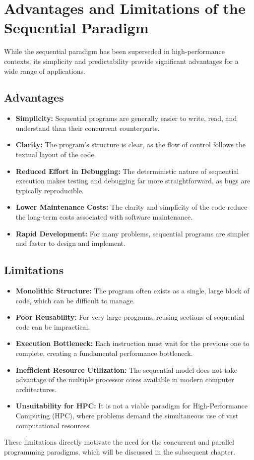 \section{Advantages and Limitations of the Sequential Paradigm}
While the sequential paradigm has been superseded in high-performance contexts, its simplicity and predictability provide significant advantages for a wide range of applications.

\subsection{Advantages}
\begin{itemize}
    \item \textbf{Simplicity:} Sequential programs are generally easier to write, read, and understand than their concurrent counterparts.
    \item \textbf{Clarity:} The program's structure is clear, as the flow of control follows the textual layout of the code.
    \item \textbf{Reduced Effort in Debugging:} The deterministic nature of sequential execution makes testing and debugging far more straightforward, as bugs are typically reproducible.
    \item \textbf{Lower Maintenance Costs:} The clarity and simplicity of the code reduce the long-term costs associated with software maintenance.
    \item \textbf{Rapid Development:} For many problems, sequential programs are simpler and faster to design and implement.
\end{itemize}

\subsection{Limitations}
\begin{itemize}
    \item \textbf{Monolithic Structure:} The program often exists as a single, large block of code, which can be difficult to manage.
    \item \textbf{Poor Reusability:} For very large programs, reusing sections of sequential code can be impractical.
    \item \textbf{Execution Bottleneck:} Each instruction must wait for the previous one to complete, creating a fundamental performance bottleneck.
    \item \textbf{Inefficient Resource Utilization:} The sequential model does not take advantage of the multiple processor cores available in modern computer architectures.
    \item \textbf{Unsuitability for HPC:} It is not a viable paradigm for High-Performance Computing (HPC), where problems demand the simultaneous use of vast computational resources.
\end{itemize}
These limitations directly motivate the need for the concurrent and parallel programming paradigms, which will be discussed in the subsequent chapter.


